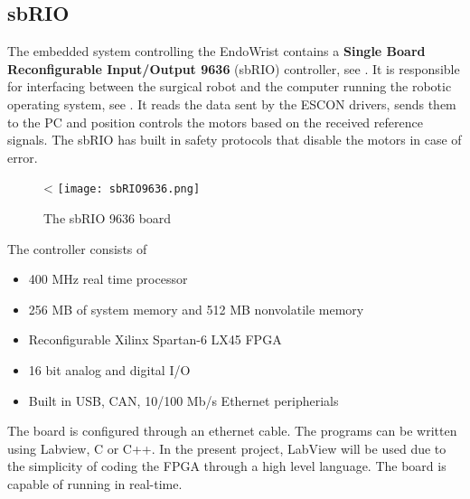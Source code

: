 \subsection{sbRIO}

The embedded system controlling the EndoWrist contains a \textbf{Single Board Reconfigurable Input/Output 9636} (sbRIO) controller, see . It is responsible for interfacing between the surgical robot and the computer running the robotic operating system\cite{Chris_Surgical}, see . It reads the data sent by the ESCON drivers, sends them to the PC and position controls the motors based on the received reference signals. The sbRIO has built in safety protocols that disable the motors in case of error.

\begin{figure}[H]
	\centering
		\centering
<		\texttt{[image: sbRIO9636.png]}
		\caption{The sbRIO 9636 board\cite{sbRIO9636Pic}}
		\label{fig:sbRIO9636}
\end{figure}


The controller consists of
\begin{itemize}
	\item 400 MHz real time processor
	\item 256 MB of system memory and 512 MB nonvolatile memory
	\item Reconfigurable Xilinx Spartan-6 LX45 FPGA
	\item 16 bit analog and digital I/O
	\item Built in USB, CAN, 10/100 Mb/s Ethernet peripherials
\end{itemize}

The board is configured through an ethernet cable. The programs can be written using Labview, C or C++. In the present project, LabView will be used due to the simplicity of coding the FPGA through a high level language. The board is capable of running in real-time. %












